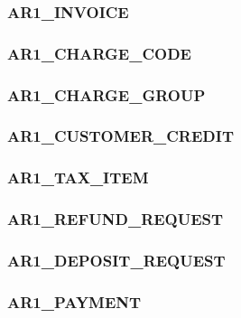 \documentclass[12pt,twoside]{article}
\begin{document}
\subsubsection{AR1\_INVOICE}
\label{sec:orgheadline82}
\subsubsection{AR1\_CHARGE\_CODE}
\label{sec:orgheadline83}

\subsubsection{AR1\_CHARGE\_GROUP}
\label{sec:orgheadline84}

\subsubsection{AR1\_CUSTOMER\_CREDIT}
\label{sec:orgheadline85}
\subsubsection{AR1\_TAX\_ITEM}
\label{sec:orgheadline86}

\subsubsection{AR1\_REFUND\_REQUEST}
\label{sec:orgheadline87}
\subsubsection{AR1\_DEPOSIT\_REQUEST}
\label{sec:orgheadline88}
\subsubsection{AR1\_PAYMENT}
\label{sec:orgheadline89}
\footnotesize
\end{document}
